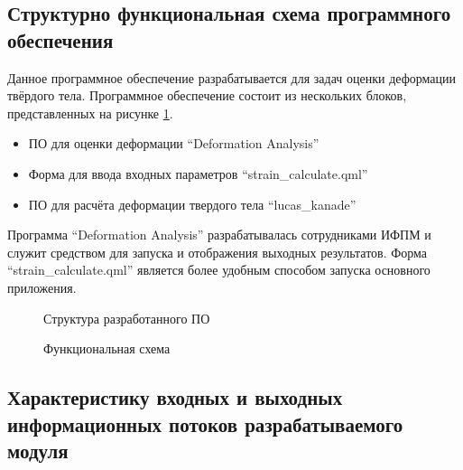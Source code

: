 \subsection{Структурно функциональная схема программного обеспечения}%

Данное программное обеспечение разрабатывается для задач оценки деформации твёрдого тела. Программное обеспечение состоит из нескольких блоков, представленных на рисунке \ref{pic:shema_PO}.

\begin{itemize}
\item ПО для оценки деформации ``Deformation Analysis''
\item Форма для ввода входных параметров ``strain\_calculate.qml''
\item ПО для расчёта деформации твердого тела ``lucas\_kanade''
\end{itemize}

Программа ``Deformation Analysis'' разрабатывалась сотрудниками ИФПМ и служит средством для запуска и отображения выходных результатов. Форма ``strain\_calculate.qml'' является более удобным способом запуска основного приложения. 

\begin{figure}[ht]
\caption{Структура разработанного ПО}
\label{pic:shema_PO}
\end{figure}

\begin{figure}[ht]
\caption{Функциональная схема}
\label{pic:idef0}
\end{figure}

\subsection{Характеристику входных и выходных информационных потоков разрабатываемого модуля}

